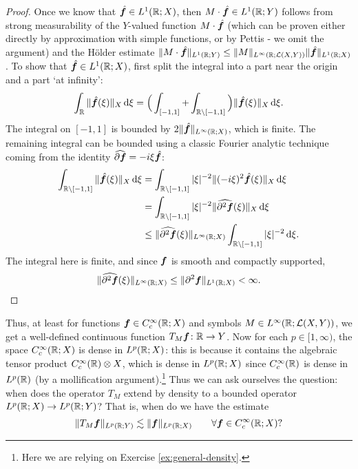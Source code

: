 \begin{proof}
  Once we know that $\hat{\bm{f}} \in L^1(\mathbb{R};X)$, then $M \cdot \hat{\bm{f}} \in L^1(\mathbb{R};Y)$ follows from strong measurability of the $Y$-valued function $M \cdot \hat{\bm{f}}$ (which can be proven either directly by approximation with simple functions, or by Pettis - we omit the argument) and the H\"older estimate $\|M \cdot \hat{\bm{f}}\|_{L^1(\mathbb{R};Y)} \leq \|M\|_{L^\infty(\mathbb{R};\mathcal{L}(X,Y))} \|\hat{\bm{f}}\|_{L^1(\mathbb{R};X)}$.
  To show that $\hat{\bm{f}} \in L^1(\mathbb{R};X)$, first split the integral into a part near the origin and a part `at infinity':
  \begin{equation*}
    \int_{\mathbb{R}} \|\hat{\bm{f}}(\xi)\|_{X} \, \mathrm{d}\xi = \Big( \int_{[-1,1]} + \int_{\mathbb{R} \setminus [-1,1]} \Big) \|\hat{\bm{f}}(\xi)\|_{X} \, \mathrm{d}\xi.
  \end{equation*}
  The integral on $[-1,1]$ is bounded by $2\|\hat{\bm{f}}\|_{L^\infty(\mathbb{R};X)}$, which is finite.
  The remaining integral can be bounded using a classic Fourier analytic technique coming from the identity $\widehat{\partial \bm{f}} = -i\xi \hat{\bm{f}}$:
  \begin{equation*}
    \begin{aligned}
    \int_{\mathbb{R} \setminus [-1,1]} \|\hat{\bm{f}}(\xi)\|_{X} \, \mathrm{d}\xi
    &= \int_{\mathbb{R} \setminus [-1,1]} |\xi|^{-2} \|(-i\xi)^{2}\hat{\bm{f}}(\xi)\|_{X} \, \mathrm{d}\xi \\
    &= \int_{\mathbb{R} \setminus [-1,1]} |\xi|^{-2} \|\widehat{\partial^{2} \bm{f}}(\xi)\|_{X} \, \mathrm{d}\xi \\
    &\leq \|\widehat{\partial^{2} \bm{f}}(\xi)\|_{L^\infty(\mathbb{R};X)} \int_{\mathbb{R} \setminus [-1,1]} |\xi|^{-2} \, \mathrm{d}\xi .
  \end{aligned}
\end{equation*}
The integral here is finite, and since $\bm{f}$ is smooth and compactly supported, 
\begin{equation*}
   \|\widehat{\partial^{2} \bm{f}}(\xi)\|_{L^\infty(\mathbb{R};X)} \leq \|\partial^{2} \bm{f}\|_{L^1(\mathbb{R};X)} < \infty.
\end{equation*}
\end{proof}

Thus, at least for functions $\bm{f} \in C_{c}^\infty(\mathbb{R};X)$ and symbols $M \in L^\infty(\mathbb{R};\mathcal{L}(X,Y))$, we get a well-defined continuous function $T_{M}\bm{f} \colon \mathbb{R} \to Y$.
Now for each $p \in [1,\infty)$, the space $C_{c}^\infty(\mathbb{R};X)$ is dense in $L^p(\mathbb{R};X)$: this is because it contains the algebraic tensor product $C_{c}^\infty(\mathbb{R}) \otimes X$, which is dense in $L^p(\mathbb{R};X)$ since $C_{c}^\infty(\mathbb{R})$ is dense in $L^p(\mathbb{R})$ (by a mollification argument).\footnote{Here we are relying on Exercise \ref{ex:general-density}.}
Thus we can ask ourselves the question: when does the operator $T_{M}$ extend by density to a bounded operator $L^p(\mathbb{R};X) \to L^p(\mathbb{R};Y)$?
That is, when do we have the estimate
\begin{equation*}
  \|T_{M} \bm{f}\|_{L^p(\mathbb{R};Y)} \lesssim \|\bm{f}\|_{L^p(\mathbb{R};X)} \qquad \forall \bm{f} \in C_{c}^\infty(\mathbb{R};X)?
\end{equation*}


